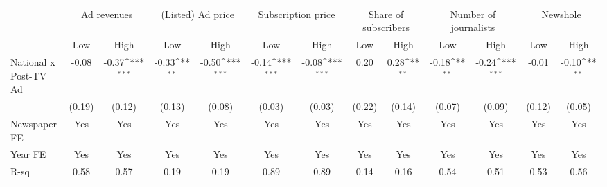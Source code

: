 {
\def\sym#1{\ifmmode^{#1}\else\(^{#1}\)\fi}
\begin{tabular}{l*{12}{c}}
\hline\hline
                    &\multicolumn{2}{c}{Ad revenues}            &\multicolumn{2}{c}{(Listed) Ad price}      &\multicolumn{2}{c}{Subscription price}     &\multicolumn{2}{c}{Share of subscribers}   &\multicolumn{2}{c}{Number of journalists}  &\multicolumn{2}{c}{Newshole}               \\\cmidrule(lr){2-3}\cmidrule(lr){4-5}\cmidrule(lr){6-7}\cmidrule(lr){8-9}\cmidrule(lr){10-11}\cmidrule(lr){12-13}
                    &\multicolumn{1}{c}{Low}&\multicolumn{1}{c}{High}&\multicolumn{1}{c}{Low}&\multicolumn{1}{c}{High}&\multicolumn{1}{c}{Low}&\multicolumn{1}{c}{High}&\multicolumn{1}{c}{Low}&\multicolumn{1}{c}{High}&\multicolumn{1}{c}{Low}&\multicolumn{1}{c}{High}&\multicolumn{1}{c}{Low}&\multicolumn{1}{c}{High}\\\cmidrule(lr){2-2}\cmidrule(lr){3-3}\cmidrule(lr){4-4}\cmidrule(lr){5-5}\cmidrule(lr){6-6}\cmidrule(lr){7-7}\cmidrule(lr){8-8}\cmidrule(lr){9-9}\cmidrule(lr){10-10}\cmidrule(lr){11-11}\cmidrule(lr){12-12}\cmidrule(lr){13-13}
\hline
National x Post-TV Ad&       -0.08         &       -0.37\sym{***}&       -0.33\sym{**} &       -0.50\sym{***}&       -0.14\sym{***}&       -0.08\sym{***}&        0.20         &        0.28\sym{**} &       -0.18\sym{**} &       -0.24\sym{***}&       -0.01         &       -0.10\sym{**} \\
                    &      (0.19)         &      (0.12)         &      (0.13)         &      (0.08)         &      (0.03)         &      (0.03)         &      (0.22)         &      (0.14)         &      (0.07)         &      (0.09)         &      (0.12)         &      (0.05)         \\
\hline
Newspaper FE        &         Yes         &         Yes         &         Yes         &         Yes         &         Yes         &         Yes         &         Yes         &         Yes         &         Yes         &         Yes         &         Yes         &         Yes         \\
Year FE             &         Yes         &         Yes         &         Yes         &         Yes         &         Yes         &         Yes         &         Yes         &         Yes         &         Yes         &         Yes         &         Yes         &         Yes         \\
R-sq                &        0.58         &        0.57         &        0.19         &        0.19         &        0.89         &        0.89         &        0.14         &        0.16         &        0.54         &        0.51         &        0.53         &        0.56         \\

\end{tabular}}
